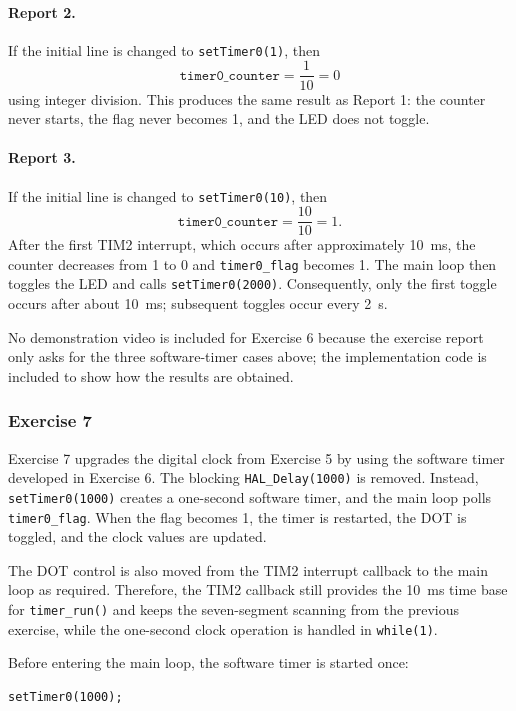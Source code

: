 \paragraph{Report 2.}
If the initial line is changed to \texttt{setTimer0(1)}, then
\[
\texttt{timer0\_counter} = \frac{1}{10} = 0
\]
using integer division. This produces the same result as Report 1: the counter never starts, the flag never becomes 1, and the LED does not toggle.

\paragraph{Report 3.}
If the initial line is changed to \texttt{setTimer0(10)}, then
\[
\texttt{timer0\_counter} = \frac{10}{10} = 1.
\]
After the first TIM2 interrupt, which occurs after approximately \SI{10}{ms}, the counter decreases from 1 to 0 and \texttt{timer0\_flag} becomes 1. The main loop then toggles the LED and calls \texttt{setTimer0(2000)}. Consequently, only the first toggle occurs after about \SI{10}{ms}; subsequent toggles occur every \SI{2}{s}.

No demonstration video is included for Exercise 6 because the exercise report only asks for the three software-timer cases above; the implementation code is included to show how the results are obtained.


\subsubsection{Exercise 7}

Exercise 7 upgrades the digital clock from Exercise 5 by using the software timer developed in Exercise 6. The blocking \texttt{HAL\_Delay(1000)} is removed. Instead, \texttt{setTimer0(1000)} creates a one-second software timer, and the main loop polls \texttt{timer0\_flag}. When the flag becomes 1, the timer is restarted, the DOT is toggled, and the clock values are updated.

The DOT control is also moved from the TIM2 interrupt callback to the main loop as required. Therefore, the TIM2 callback still provides the \SI{10}{ms} time base for \texttt{timer\_run()} and keeps the seven-segment scanning from the previous exercise, while the one-second clock operation is handled in \texttt{while(1)}.

Before entering the main loop, the software timer is started once:
\begin{lstlisting}[caption={Starting the one-second software timer}]
setTimer0(1000);
\end{lstlisting}

